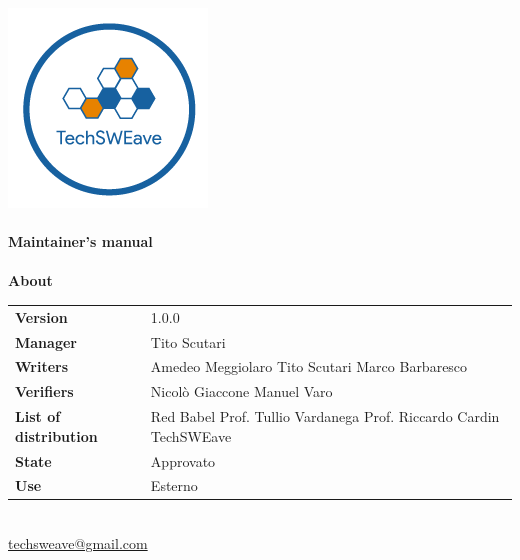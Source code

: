\documentclass[a4paper]{article}
\begin{document}
\begin{titlepage}
    \begin{center}
        \includegraphics{../../../../Images/logo.png}\\
        \vspace{20px}
        \textcolor{logo}{\hrulefill}\\
        \vspace{20px}
        \textbf{\huge\textcolor{logo}{Maintainer's manual}}\\
        \vspace{10px}
        \textcolor{logo}{\hrulefill}\\
        \vspace{40px}
        \textbf{\Large About}\\
        \vspace{20px}
        \begin{tabular}{p{100px} | p{100px}}
            \textbf{Version}              & 1.0.0                                                                     \\
            \textbf{Manager}              & Tito Scutari                                                              \\
            \textbf{Writers}              & Amedeo Meggiolaro \newline Tito Scutari \newline Marco Barbaresco         \\
            \textbf{Verifiers}            & Nicolò Giaccone \newline Manuel Varo                                      \\
            \textbf{List of distribution} & Red Babel \newline Prof. Tullio Vardanega \newline Prof. Riccardo Cardin \newline TechSWEave \\
            \textbf{State}                & Approvato                                                                 \\
            \textbf{Use}                  & Esterno                                                                   \\
        \end{tabular}\\
        \vspace{60px}
        \href{mailto:techsweave@gmail.com}{techsweave@gmail.com}\\

    \end{center}
\end{titlepage}
\end{document}

